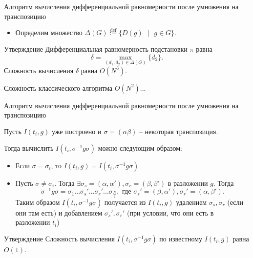 \documentclass{beamer}
\begin{document}
\begin{frame}{Алгоритм вычисления дифференциальной равномерности после умножения на транспозицию}
\begin{itemize}
    \item Определим множество $\Delta(G) \stackrel{\text{def}}{:=} \{D(g) \text{ } | \text{ } g \in G\}$. 
\end{itemize}

\begin{block}{Утверждение}
 Дифференциальная равномерность подстановки $\pi$ равна $$\delta = \underset{(d_{1}, d_{2}) \in \Delta(G)}{\max} \{d_{2} \}.$$ Сложность вычисления $\delta$ равна $O(N^{3})$.
\end{block}


Сложность классического алгоритма $O(N^2)$...
\end{frame}

\begin{frame}{Алгоритм вычисления дифференциальной равномерности после умножения на транспозицию}

Пусть $I(t_i,g)$ уже построено и $\sigma = (\alpha \beta)$ -- некоторая транспозиция.

Тогда вычислить $I(t_i,\sigma^{-1}g\sigma)$ можно следующим образом:
\begin{itemize}
\item Если $\sigma = \sigma_i$, то $I(t_i,g)=I(t_i,\sigma^{-1}g\sigma)$
\item Пусть $\sigma \neq \sigma_i$. Тогда $\exists \sigma_s=(\alpha, \alpha'),\sigma_r=(\beta, \beta')$ в разложении $g$. Тогда $$\sigma^{-1}g\sigma = \sigma_1...\sigma_s'...\sigma_r'...\sigma_{\frac{N}{2}}, \text{ где } \sigma_s'=(\beta, \alpha'),\sigma_r'=(\alpha, \beta').$$
Таким образом $I(t_i, \sigma^{-1}g\sigma)$ получается из $I(t_i,g)$ удалением $\sigma_s,\sigma_r$ (если они там есть) и добавлением $\sigma_s',\sigma_r'$ (при условии, что они есть в разложении $t_i$)
\end{itemize}

\begin{block}{Утверждение}
 Сложность вычисления $I(t_i,\sigma^{-1}g\sigma)$ по известному $I(t_i,g)$ равна $O(1)$.
\end{block}
\end{frame}
\end{document}
